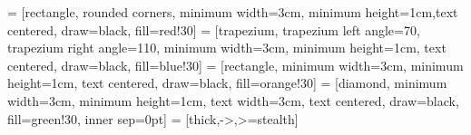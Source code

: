  = [rectangle, rounded corners, minimum width=3cm, minimum height=1cm,text centered, draw=black, fill=red!30]
 = [trapezium, trapezium left angle=70, trapezium right angle=110, minimum width=3cm, minimum height=1cm, text centered, draw=black, fill=blue!30]
 = [rectangle, minimum width=3cm, minimum height=1cm, text centered, draw=black, fill=orange!30]
 = [diamond, minimum width=3cm, minimum height=1cm, text width=3cm, text centered, draw=black, fill=green!30,   inner sep=0pt]
 = [thick,->,>=stealth]
